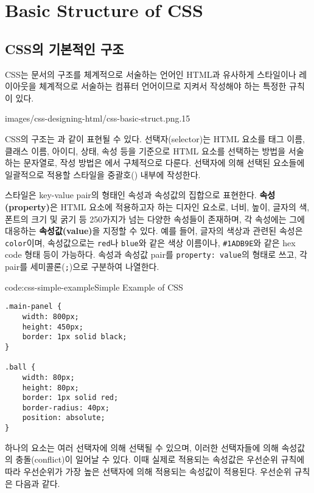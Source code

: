 \section{Basic Structure of CSS} \label{sect:basic-structure-of-css}

\subsection*{CSS의 기본적인 구조}

CSS는 문서의 구조를 체계적으로 서술하는 언어인 HTML과 유사하게 스타일이나 레이아웃을 체계적으로 서술하는 컴퓨터 언어이므로 지켜서 작성해야 하는 특정한 규칙이 있다.

    {images/css-designing-html/css-basic-struct.png}{.15}

CSS의 구조는 과 같이 표현될 수 있다. 선택자(selector)는 HTML 요소를 태그 이름, 클래스 이름, 아이디, 상태, 속성 등을 기준으로 HTML 요소를 선택하는 방법을 서술하는 문자열로, 작성 방법은 에서 구체적으로 다룬다. 선택자에 의해 선택된 요소들에 일괄적으로 적용할 스타일을 중괄호(\texttt{{}}) 내부에 작성한다.

스타일은 key-value pair의 형태인 속성과 속성값의 집합으로 표현한다. \textbf{속성(property)}은 HTML 요소에 적용하고자 하는 디자인 요소로, 너비, 높이, 글자의 색, 폰트의 크기 및 굵기 등 250가지가 넘는 다양한 속성들이 존재하며, 각 속성에는 그에 대응하는 \textbf{속성값(value)}을 지정할 수 있다. 예를 들어, 글자의 색상과 관련된 속성은 \texttt{color}이며, 속성값으로는 \texttt{red}나 \texttt{blue}와 같은 색상 이름이나, \texttt{\#1ADB9E}와 같은 hex code 형태 등이 가능하다. 속성과 속성값 pair를 \verb|property: value|의 형태로 쓰고, 각 pair를 세미콜론(\texttt{;})으로 구분하여 나열한다.

\begin{codeenv}{code:css-simple-example}{Simple Example of CSS}\begin{verbatim}
.main-panel {
    width: 800px;
    height: 450px;
    border: 1px solid black;
}

.ball {
    width: 80px;
    height: 80px;
    border: 1px solid red;
    border-radius: 40px;
    position: absolute;
}
\end{verbatim}
\end{codeenv}

하나의 요소는 여러 선택자에 의해 선택될 수 있으며, 이러한 선택자들에 의해 속성값의 충돌(conflict)이 일어날 수 있다. 이때 실제로 적용되는 속성값은 우선순위 규칙에 따라 우선순위가 가장 높은 선택자에 의해 적용되는 속성값이 적용된다. 우선순위 규칙은 다음과 같다.

